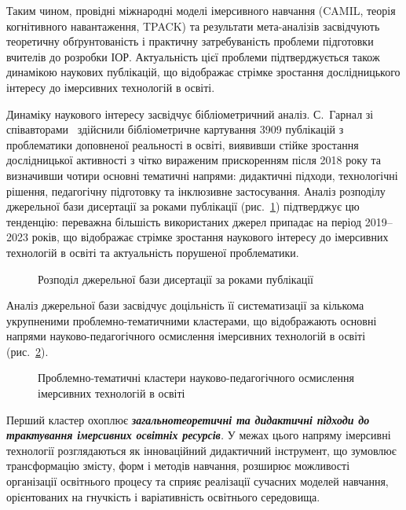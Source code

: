 Таким чином, провідні міжнародні моделі імерсивного навчання (CAMIL, теорія когнітивного навантаження, TPACK) та результати мета-аналізів засвідчують теоретичну обґрунтованість і практичну затребуваність проблеми підготовки вчителів до розробки ІОР. Актуальність цієї проблеми підтверджується також динамікою наукових публікацій, що відображає стрімке зростання дослідницького інтересу до імерсивних технологій в освіті.

Динаміку наукового інтересу засвідчує бібліометричний аналіз. С.~Гарнал зі співавторами~\cite{Harnal2023Bibliometric} здійснили бібліометричне картування 3909 публікацій з проблематики доповненої реальності в освіті, виявивши стійке зростання дослідницької активності з чітко вираженим прискоренням після 2018 року та визначивши чотири основні тематичні напрями: дидактичні підходи, технологічні рішення, педагогічну підготовку та інклюзивне застосування. Аналіз розподілу джерельної бази дисертації за роками публікації (рис.~\ref{fig:biblio_dynamics}) підтверджує цю тенденцію: переважна більшість використаних джерел припадає на період 2019--2023 років, що відображає стрімке зростання наукового інтересу до імерсивних технологій в освіті та актуальність порушеної проблематики.

\begin{figure}[!h]
\centering

\caption{Розподіл джерельної бази дисертації за роками публікації}
\label{fig:biblio_dynamics}
\end{figure}


Аналіз джерельної бази засвідчує доцільність її систематизації за кількома укрупненими проблемно-тематичними кластерами, що відображають основні напрями науково-педагогічного осмислення імерсивних технологій в освіті (рис.~\ref{fig:1.1}).

\begin{figure}[!h]
\centering

\caption{Проблемно-тематичні кластери науково-педагогічного осмислення імерсивних технологій в освіті}
\label{fig:1.1}
\end{figure}

Перший кластер охоплює \emph{\textbf{загальнотеоретичні та дидактичні підходи до трактування імерсивних освітніх ресурсів}.} У межах цього напряму імерсивні технології розглядаються як інноваційний дидактичний інструмент, що зумовлює трансформацію змісту, форм і методів навчання, розширює можливості організації освітнього процесу та сприяє реалізації сучасних моделей навчання, орієнтованих на гнучкість і варіативність освітнього середовища.

